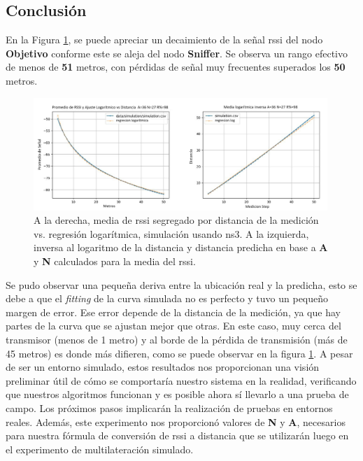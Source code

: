 \subsection{Conclusión}
En la Figura \ref{fig:profiling-result-sim}, se puede apreciar un decaimiento de la señal \acs{rssi} del nodo \textbf{Objetivo} conforme este se aleja del nodo \textbf{Sniffer}. Se observa un rango efectivo de menos de \textbf{51} metros, con pérdidas de señal muy frecuentes superados los \textbf{50} metros.
\begin{figure}[!htb]
\centering
\includegraphics[width=0.99\textwidth]{Figuras/profiling/simulation/simulated-profiling-combo.jpg}
\captionsetup{margin=2cm}
\caption[ A la derecha, media de RSSI segregado por distancia de la medición vs regresión logarítmica, simulación usando NS3. A la izquierda, inversa al logaritmo de la distancia y distancia predicha en base a A y N calculados para la media del RSSI]{A la derecha, media de \acs{rssi} segregado por distancia de la medición vs. regresión logarítmica, simulación usando \acs{ns3}. A la izquierda, inversa al logaritmo de la distancia y distancia predicha en base a \textbf{A} y \textbf{N} calculados para la media del \acs{rssi}.}
\label{fig:profiling-result-sim}
\end{figure}
Se pudo observar una pequeña deriva entre la ubicación real y la predicha, esto se debe a que el \textit{fitting} de la curva simulada no es perfecto y tuvo un pequeño margen de error. Ese error depende de la distancia de la medición, ya que hay partes de la curva que se ajustan mejor que otras. En este caso, muy cerca del transmisor (menos de 1 metro) y al borde de la pérdida de transmisión (más de 45 metros) es donde más difieren, como se puede observar en la figura \ref{fig:profiling-result-sim}.
A pesar de ser un entorno simulado, estos resultados nos proporcionan una visión preliminar útil de cómo se comportaría nuestro sistema en la realidad, verificando que nuestros algoritmos funcionan y es posible ahora sí llevarlo a una prueba de campo. Los próximos pasos implicarán la realización de pruebas en entornos reales. Además, este experimento nos proporcionó valores de \textbf{N} y \textbf{A}, necesarios para nuestra fórmula de conversión de \acs{rssi} a distancia que se utilizarán luego en el experimento de multilateración simulado.
